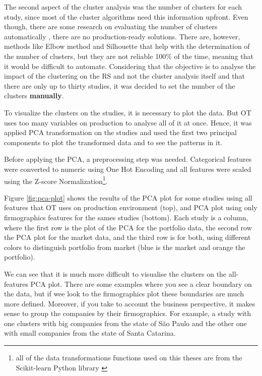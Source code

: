 The second aspect of the cluster analysis was the number of clusters for each study, since most of the cluster algorithms need this information upfront. Even though, there are some research on evaluating the number of clusters automatically \cite{yu2014automatic}, there are no production-ready solutions. There are, however, methods like Elbow method and Silhouette \cite{kodinariya2013review} that help with the determination of the number of clusters, but they are not reliable 100\% of the time, meaning that it would be difficult to automate. Considering that the objective is to analyse the impact of the clustering on the RS and not the cluster analysis itself and that there are only up to thirty studies, it was decided to set the number of the clusters \textbf{manually}.

To visualize the clusters on the studies, it is necessary to plot the data. But OT uses too many variables on production to analyse all of it at once. Hence, it was applied PCA transformation on the studies and used the first two principal components to plot the transformed data and to see the patterns in it. 

Before applying the PCA, a preprocessing step was needed. Categorical features were converted to numeric using One Hot Encoding and all features were scaled using the Z-score Normalization\footnote{all of the data transformations functions used on this theses are from the Scikit-learn Python library \cite{scikit-learn}}.

Figure \ref{fig:pca-plot} shows the results of the PCA plot for some studies using all features that OT uses on production environment (top), and PCA plot using only firmographics features for the sames studies (bottom). Each study is a column, where the first row is the plot of the PCA for the portfolio data, the second row the PCA plot for the market data, and the third row is for both, using different colors to distinguish portfolio from market (blue is the market and orange the portfolio).

We can see that it is much more difficult to visualise the clusters on the all-features PCA plot. There are some examples where you see a clear boundary on the data, but if wee look to the firmographics plot these boundaries are much more defined. Moreover, if you take to account the business perspective, it makes sense to group the companies by their firmographics. For example, a study with one clusters with big companies from the state of São Paulo and the other one with small companies from the state of Santa Catarina.


